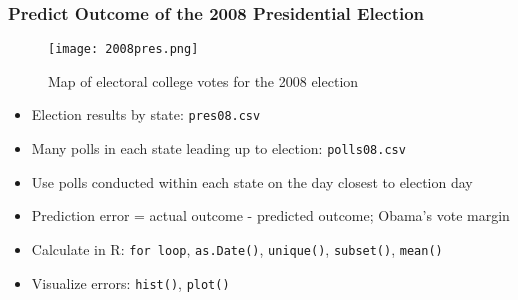 \documentclass[handout]{beamer}
\begin{document}
\begin{frame}
 \frametitle{Predict Outcome of the 2008 Presidential Election}
 \begin{minipage}{.4\linewidth}
 \begin{figure}
 \caption{Map of electoral college votes for the 2008 election}
 \texttt{[image: 2008pres.png]}
 \end{figure}
 \end{minipage}\hfill
 \begin{minipage}{.58\linewidth}
 \begin{itemize}[<+->]
   \item Election results by state: {\tt pres08.csv}
   \item Many polls in each state leading up to election: {\tt polls08.csv}
   \item Use polls conducted within each state on the day closest to election day
   \item Prediction error = actual outcome - predicted outcome; Obama's vote margin
   \item Calculate in R: {\tt for loop}, {\tt as.Date()}, {\tt unique()}, {\tt subset()}, {\tt mean()}
   \item Visualize errors: {\tt hist()}, {\tt plot()}
 \end{itemize}
 \end{minipage}
\end{frame}

%
%

\end{document}
